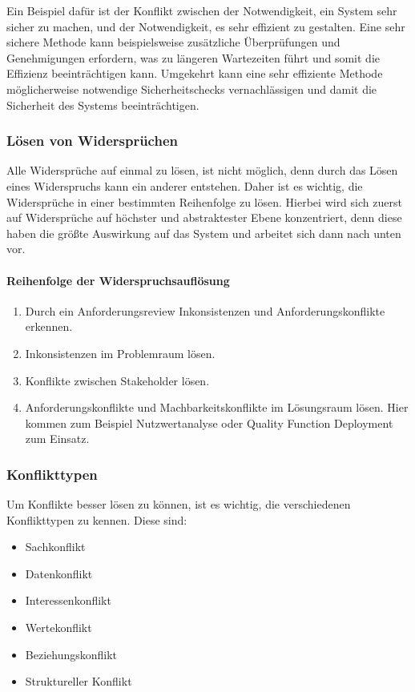 Ein Beispiel dafür ist der Konflikt zwischen der Notwendigkeit, ein System sehr sicher zu machen,
und der Notwendigkeit, es sehr effizient zu gestalten.
Eine sehr sichere Methode kann beispielsweise zusätzliche Überprüfungen und Genehmigungen erfordern,
was zu längeren Wartezeiten führt und somit die Effizienz beeinträchtigen kann.
Umgekehrt kann eine sehr effiziente Methode möglicherweise notwendige Sicherheitschecks vernachlässigen
und damit die Sicherheit des Systems beeinträchtigen.\autocite[vgl.][S.236]{Herrmann.2022}

\subsubsection{Lösen von Widersprüchen}\label{subsubsec:loesen}
Alle Widersprüche auf einmal zu lösen, ist nicht möglich,
denn durch das Lösen eines Widerspruchs kann ein anderer entstehen.
Daher ist es wichtig, die Widersprüche in einer bestimmten Reihenfolge zu lösen.
Hierbei wird sich zuerst auf Widersprüche auf höchster und abstraktester Ebene konzentriert,
denn diese haben die größte Auswirkung auf das System und arbeitet sich dann nach unten vor.

\paragraph{Reihenfolge der Widerspruchsauflösung}
\begin{enumerate}
    \item Durch ein Anforderungsreview Inkonsistenzen und Anforderungskonflikte erkennen.
    \item Inkonsistenzen im Problemraum lösen.
    \item Konflikte zwischen Stakeholder lösen.
    \item Anforderungskonflikte und Machbarkeitskonflikte im Lösungsraum lösen.
    Hier kommen zum Beispiel Nutzwertanalyse oder Quality Function Deployment zum Einsatz.
\end{enumerate}\autocite[vgl.][S.237f]{Herrmann.2022}

\subsubsection{Konflikttypen}
Um Konflikte besser lösen zu können, ist es wichtig, die verschiedenen Konflikttypen zu kennen.
Diese sind:
\begin{itemize}
    \item Sachkonflikt
    \item Datenkonflikt
    \item Interessenkonflikt
    \item Wertekonflikt
    \item Beziehungskonflikt
    \item Struktureller Konflikt
\end{itemize}\autocite[vgl.][S.137]{Pohl.2021}

